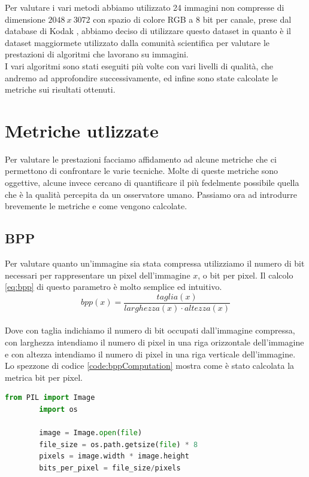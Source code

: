 Per valutare i vari metodi abbiamo utilizzato 24 immagini non compresse di dimensione $2048\:x\:3072$ con spazio di colore RGB a 8 bit per canale, prese dal database di Kodak \cite{KodakDataset}, abbiamo deciso di utilizzare questo dataset in quanto è il dataset maggiormete utilizzato dalla comunità scientifica per valutare le prestazioni di algoritmi che lavorano su immagini.\\
I vari algoritmi sono stati eseguiti più volte con vari livelli di qualità, che andremo ad approfondire successivamente, ed infine sono state calcolate le metriche sui risultati ottenuti.\\

\section{Metriche utlizzate}
Per valutare le prestazioni facciamo affidamento ad alcune metriche che ci permettono di confrontare le varie tecniche. Molte di queste metriche sono oggettive, alcune invece cercano di quantificare il più fedelmente possibile quella che è la qualità percepita da un osservatore umano.
Passiamo ora ad introdurre brevemente le metriche e come vengono calcolate.\\

\subsection{BPP}
Per valutare quanto un’immagine sia stata compressa utilizziamo il numero di bit necessari per rappresentare un pixel dell’immagine $x$, o bit per pixel. Il calcolo \ref{eq:bpp} di questo parametro è molto semplice ed intuitivo.\\
\begin{equation}\label{eq:bpp}
    bpp(x) = \dfrac{taglia (x)}{larghezza (x) \cdot altezza (x)}
\end{equation}\\
Dove con taglia indichiamo il numero di bit occupati dall’immagine compressa, con larghezza intendiamo il numero di pixel in una riga orizzontale dell’immagine e con altezza intendiamo il numero di pixel in una riga verticale dell’immagine.\\
Lo spezzone di codice \ref{code:bppComputation} mostra come è stato calcolata la metrica bit per pixel.\\
\begin{adjustbox}{max width=\textwidth}
    \begin{lstlisting}[language=Python, caption=Spezzone di codice per il calcolo dei bit per pixel, label=code:bppComputation]
        from PIL import Image
        import os
        
        image = Image.open(file)
        file_size = os.path.getsize(file) * 8
        pixels = image.width * image.height
        bits_per_pixel = file_size/pixels
    \end{lstlisting}
\end{adjustbox}

